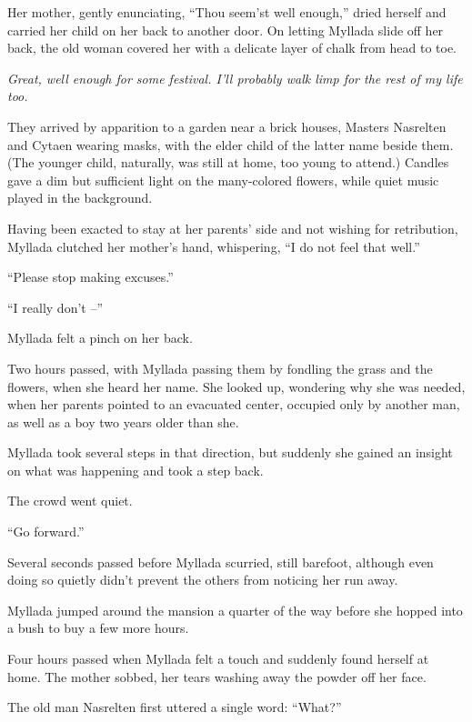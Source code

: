 Her mother, gently enunciating, ``Thou seem'st well enough,'' dried herself and carried her child on her back to another door. On letting Myllada slide off her back, the old woman covered her with a delicate layer of chalk from head to toe.

\emph{Great, well enough for some festival. I'll probably walk limp for the rest of my life too.}

\centeredstars

They arrived by apparition to a garden near a brick houses, Masters Nasrelten and Cytaen wearing masks, with the elder child of the latter name beside them. (The younger child, naturally, was still at home, too young to attend.) Candles gave a dim but sufficient light on the many-colored flowers, while quiet music played in the background.

Having been exacted to stay at her parents' side and not wishing for retribution, Myllada clutched her mother's hand, whispering, ``I do not feel that well.''

``Please stop making excuses.''

``I really don't --''

Myllada felt a pinch on her back.

\centeredstars

Two hours passed, with Myllada passing them by fondling the grass and the flowers, when she heard her name. She looked up, wondering why she was needed, when her parents pointed to an evacuated center, occupied only by another man, as well as a boy two years older than she.

Myllada took several steps in that direction, but suddenly she gained an insight on what was happening and took a step back.

The crowd went quiet.

``Go forward.''

Several seconds passed before Myllada scurried, still barefoot, although even doing so quietly didn't prevent the others from noticing her run away.

Myllada jumped around the mansion a quarter of the way before she hopped into a bush to buy a few more hours.

\centeredstars

Four hours passed when Myllada felt a touch and suddenly found herself at home. The mother sobbed, her tears washing away the powder off her face.

The old man Nasrelten first uttered a single word: ``What?''

